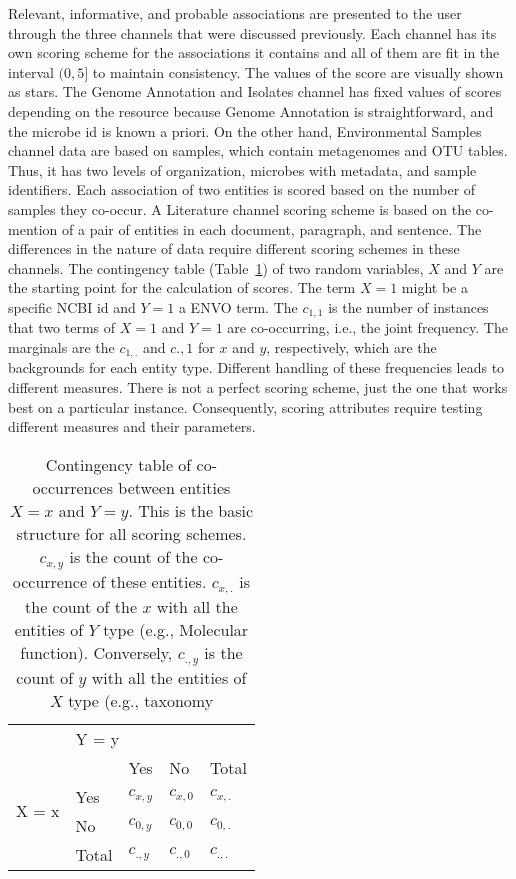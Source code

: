 {Relevant, informative, and probable associations are presented to the user through the three channels that were discussed previously. 
Each channel has its own scoring scheme for the associations it contains and all of them are fit in the interval $(0,5]$ to maintain consistency. 
The values of the score are visually shown as stars. 
The Genome Annotation and Isolates channel has fixed values of scores depending on the resource because Genome Annotation is straightforward, and the microbe id is known a priori. 
On the other hand, Environmental Samples channel data are based on samples, which contain metagenomes and OTU tables. 
Thus, it has two levels of organization, microbes with metadata, and sample identifiers. Each association of two entities is scored based on the number of samples they co-occur. 
A Literature channel scoring scheme is based on the co-mention of a pair of entities in each document, paragraph, and sentence. The differences in the nature of data require different scoring schemes in these channels.
The contingency table (Table~\ref{table:pregoA1}) of two random variables, $X$ and $Y$ are the starting point for the calculation of scores. The term $X = 1$ might be a specific NCBI id and $Y = 1$ a ENVO term. 
The $c_{1,1}$ is the number of instances that two terms of $X = 1$ and $Y = 1$ are co-occurring, i.e., the joint frequency. 
The marginals are the $c_{1,.}$ and $c{.,1}$ for $x$ and $y$, respectively, which are the backgrounds for each entity type. 
Different handling of these frequencies leads to different measures. 
There is not a perfect scoring scheme, just the one that works best on a particular instance. 
Consequently, scoring attributes require testing different measures and their parameters.



\begin{table}[ht]
   \centering
   \begin{tabular}{c|llll}
    & \multicolumn{4}{l}{Y = y} \\ \cline{2-5} 
   \multirow{4}{*}{X = x} &  & Yes & No & Total \\ \cline{3-5} 
    & \multicolumn{1}{l|}{Yes} & $c_{x,y}$ & $c_{x,0}$ & $c_{x,.}$ \\
    & \multicolumn{1}{l|}{No} & $c_{0,y}$ & $c_{0,0}$ & $c_{0,.}$ \\
    & \multicolumn{1}{l|}{Total} & $c_{.,y}$ & $c_{.,0}$ & $c_{.,.}$
   \end{tabular}
   \caption[PREGO contingency table between two terms]{Contingency table of co-occurrences between entities $X = x$ and $Y = y$. 
   This is the basic structure for all scoring schemes. $c_{x,y}$ is the count of the co-occurrence of these entities. $c_{x,.}$ is the count of the $x$ with all the entities of $Y$ type (e.g., Molecular function). Conversely, $c_{.,y}$ is the count of $y$ with all the entities of $X$ type (e.g., taxonomy}
   \label{table:pregoA1}
\end{table}


}
